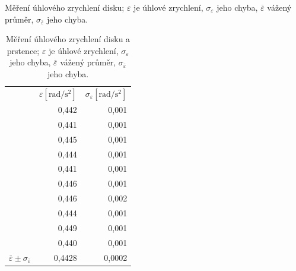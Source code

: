 \documentclass[english]{article}
\newcommand{\unit}[1]{\mathrm{#1}}
\begin{document}
\begin{table}[h]
{   
  \caption{Měření úhlového zrychlení disku; $\varepsilon$ je úhlové zrychlení, $\sigma_{\varepsilon}$ jeho chyba, $\overline{\varepsilon}$ vážený průměr, $\sigma_{\overline{\varepsilon}}$ jeho chyba.}
  \label{tab:moment_disk}%
}
\hfill
\parbox{.45\linewidth}{
\centering
    \begin{tabular}{|r|r|r|}
\cline{2-3}    \multicolumn{1}{r|}{} & $\varepsilon \unit{[ rad/s^2]}$ & $\sigma_{\varepsilon}\unit{ [rad/s^2]}$ \bigstrut\\
\cline{2-3}    \multicolumn{1}{r|}{} & 0,442 & 0,001 \bigstrut\\
\cline{2-3}    \multicolumn{1}{r|}{} & 0,441 & 0,001 \bigstrut\\
\cline{2-3}    \multicolumn{1}{r|}{} & 0,445 & 0,001 \bigstrut\\
\cline{2-3}    \multicolumn{1}{r|}{} & 0,444 & 0,001 \bigstrut\\
\cline{2-3}    \multicolumn{1}{r|}{} & 0,441 & 0,001 \bigstrut\\
\cline{2-3}    \multicolumn{1}{r|}{} & 0,446 & 0,001 \bigstrut\\
\cline{2-3}    \multicolumn{1}{r|}{} & 0,446 & 0,002 \bigstrut\\
\cline{2-3}    \multicolumn{1}{r|}{} & 0,444 & 0,001 \bigstrut\\
\cline{2-3}    \multicolumn{1}{r|}{} & 0,449 & 0,001 \bigstrut\\
\cline{2-3}    \multicolumn{1}{r|}{} & 0,440 & 0,001 \bigstrut\\
    \hline
    $\overline{\varepsilon} \pm \sigma_{\overline{\varepsilon}}$ & 0,4428 & 0,0002 \bigstrut\\
    \hline
    \end{tabular}%

      
   
  \caption{Měření úhlového zrychlení disku a prstence; $\varepsilon$ je úhlové zrychlení, $\sigma_{\varepsilon}$ jeho chyba, $\overline{\varepsilon}$ vážený průměr, $\sigma_{\overline{\varepsilon}}$ jeho chyba.}
    \label{tab:moment_disk_a_prst}%

}

\end{table}
\end{document}

